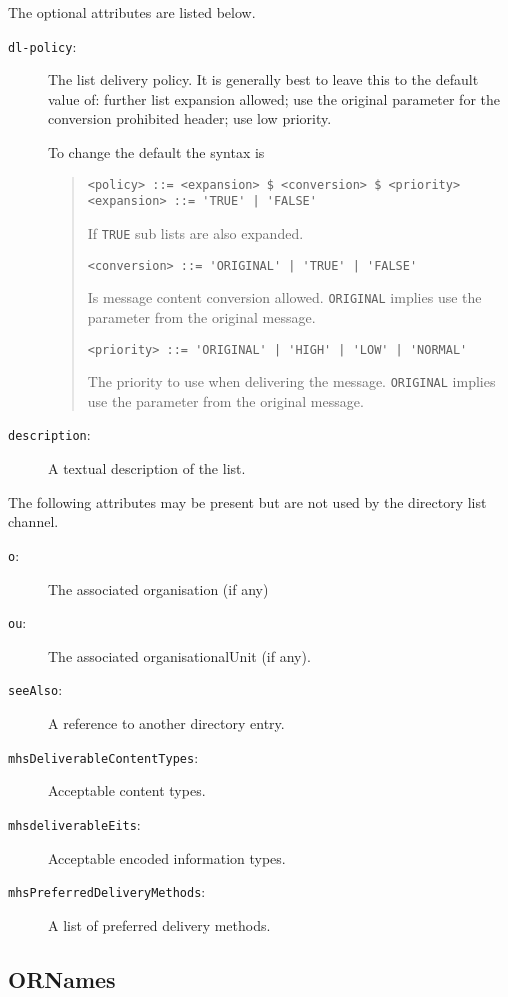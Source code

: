 The optional attributes are listed below.

\begin{description}
\item[\verb+dl-policy+:]
	The list delivery policy.
	It is generally best to leave this to the default
	value of: further list expansion allowed; use the original
	parameter for the conversion prohibited header; 
	use low priority.

	To change the default the syntax is
	\begin{quote}\begin{verbatim}
<policy> ::= <expansion> $ <conversion> $ <priority>
<expansion> ::= 'TRUE' | 'FALSE'  
	\end{verbatim}
If \verb+TRUE+ sub lists are also expanded.
	\begin{verbatim}
<conversion> ::= 'ORIGINAL' | 'TRUE' | 'FALSE'
	\end{verbatim}
Is message content conversion allowed.
\verb+ORIGINAL+ implies use the parameter from the original message.
	\begin{verbatim}
<priority> ::= 'ORIGINAL' | 'HIGH' | 'LOW' | 'NORMAL'
	\end{verbatim}
The priority to use when delivering the message.
\verb+ORIGINAL+ implies use the parameter from the original message.
	\end{quote}
\item[\verb+description+:]
	A textual description of the list.
\end{description}
The following attributes may be present but are not used by the
directory list channel.
\begin{description}
\item[\verb+o+:]
	The associated organisation (if any)
\item[\verb+ou+:]
	The associated organisationalUnit (if any).
\item[\verb+seeAlso+:]
	A reference to another directory entry.
\item[\verb+mhsDeliverableContentTypes+:]
	Acceptable content types.
\item[\verb+mhsdeliverableEits+:]
	Acceptable encoded information types.
\item[\verb+mhsPreferredDeliveryMethods+:]
	A list of preferred delivery methods.
\end{description}

\subsection{ORNames}\label{DL:ORName}

